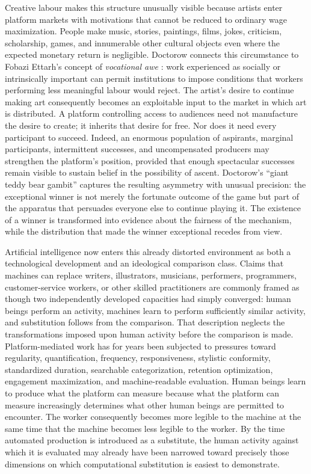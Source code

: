 \documentclass[11pt]{article}
\begin{document}
Creative labour makes this structure unusually visible because artists enter platform markets with motivations that cannot be reduced to ordinary wage maximization. People make music, stories, paintings, films, jokes, criticism, scholarship, games, and innumerable other cultural objects even where the expected monetary return is negligible. Doctorow connects this circumstance to Fobazi Ettarh's concept of \emph{vocational awe} \parencite{ettarh2018vocationalawe}: work experienced as socially or intrinsically important can permit institutions to impose conditions that workers performing less meaningful labour would reject. The artist's desire to continue making art consequently becomes an exploitable input to the market in which art is distributed. A platform controlling access to audiences need not manufacture the desire to create; it inherits that desire for free. Nor does it need every participant to succeed. Indeed, an enormous population of aspirants, marginal participants, intermittent successes, and uncompensated producers may strengthen the platform's position, provided that enough spectacular successes remain visible to sustain belief in the possibility of ascent. Doctorow's ``giant teddy bear gambit'' \parencite{doctorowgiblin2022chokepoint} captures the resulting asymmetry with unusual precision: the exceptional winner is not merely the fortunate outcome of the game but part of the apparatus that persuades everyone else to continue playing it. The existence of a winner is transformed into evidence about the fairness of the mechanism, while the distribution that made the winner exceptional recedes from view.

Artificial intelligence now enters this already distorted environment as both a technological development and an ideological comparison class. Claims that machines can replace writers, illustrators, musicians, performers, programmers, customer-service workers, or other skilled practitioners are commonly framed as though two independently developed capacities had simply converged: human beings perform an activity, machines learn to perform sufficiently similar activity, and substitution follows from the comparison. That description neglects the transformations imposed upon human activity before the comparison is made. Platform-mediated work has for years been subjected to pressures toward regularity, quantification, frequency, responsiveness, stylistic conformity, standardized duration, searchable categorization, retention optimization, engagement maximization, and machine-readable evaluation. Human beings learn to produce what the platform can measure because what the platform can measure increasingly determines what other human beings are permitted to encounter. The worker consequently becomes more legible to the machine at the same time that the machine becomes less legible to the worker. By the time automated production is introduced as a substitute, the human activity against which it is evaluated may already have been narrowed toward precisely those dimensions on which computational substitution is easiest to demonstrate.
\end{document}
